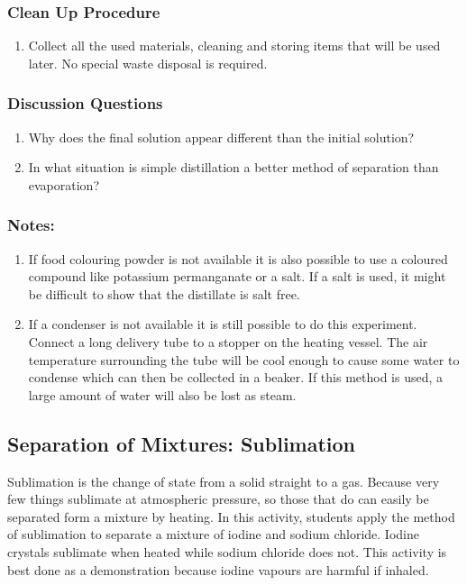 \subsubsection*{Clean Up Procedure}
\begin{enumerate}
\item{Collect all the used materials, cleaning and storing items that will be used later. No special waste disposal is required.}
\end{enumerate}

\subsubsection*{Discussion Questions}
\begin{enumerate}
\item{Why does the final solution appear different than the initial solution?}
\item{In what situation is simple distillation a better method of separation than evaporation?}
\end{enumerate}
\subsubsection*{Notes:}
\begin{enumerate}
\item{If food colouring powder is not available it is also possible to use a coloured compound like potassium permanganate or a salt. If a salt is used, it might be difficult to show that the distillate is salt free.}
\item{If a condenser is not available it is still possible to do this experiment. Connect a long delivery tube to a stopper on the heating vessel. The air temperature surrounding the tube will be cool enough to cause some water to condense which can then be collected in a beaker. If this method is used, a large amount of water will also be lost as steam.}
\end{enumerate}

\subsection{Separation of Mixtures: Sublimation}
Sublimation is the change of state from a solid straight to a gas. Because very few things sublimate at atmospheric pressure, so those that do can easily be separated form a mixture by heating. In this activity, students apply the method of sublimation to separate a mixture of iodine and sodium chloride. Iodine crystals sublimate when heated while sodium chloride does not. This activity is best done as a demonstration because iodine vapours are harmful if inhaled.

